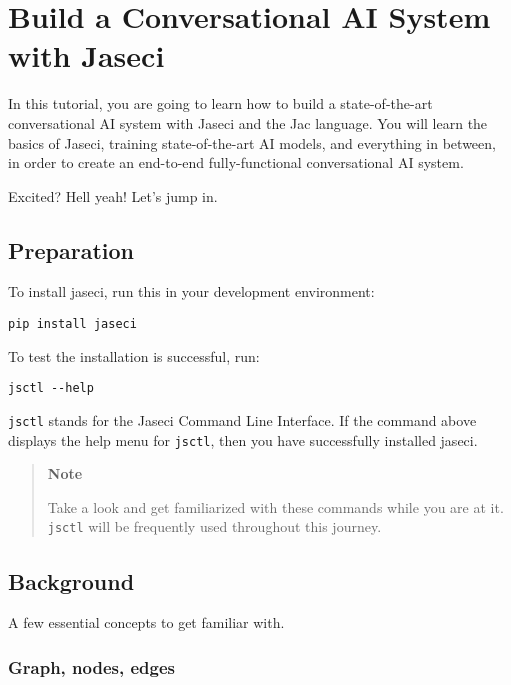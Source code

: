 \hypertarget{build-a-conversational-ai-system-with-jaseci}{%
\section{Build a Conversational AI System with
Jaseci}\label{build-a-conversational-ai-system-with-jaseci}}

In this tutorial, you are going to learn how to build a state-of-the-art
conversational AI system with Jaseci and the Jac language. You will
learn the basics of Jaseci, training state-of-the-art AI models, and
everything in between, in order to create an end-to-end fully-functional
conversational AI system.

Excited? Hell yeah! Let's jump in.

\hypertarget{preparation}{%
\subsection{Preparation}\label{preparation}}

To install jaseci, run this in your development environment:

\begin{lstlisting}
pip install jaseci
\end{lstlisting}

To test the installation is successful, run:

\begin{lstlisting}
jsctl --help
\end{lstlisting}

\passthrough{\lstinline!jsctl!} stands for the Jaseci Command Line
Interface. If the command above displays the help menu for
\passthrough{\lstinline!jsctl!}, then you have successfully installed
jaseci.

\begin{quote}
\textbf{Note}

Take a look and get familiarized with these commands while you are at
it. \passthrough{\lstinline!jsctl!} will be frequently used throughout
this journey.
\end{quote}

\hypertarget{background}{%
\subsection{Background}\label{background}}

A few essential concepts to get familiar with.

\hypertarget{graph-nodes-edges}{%
\subsubsection{Graph, nodes, edges}\label{graph-nodes-edges}}

